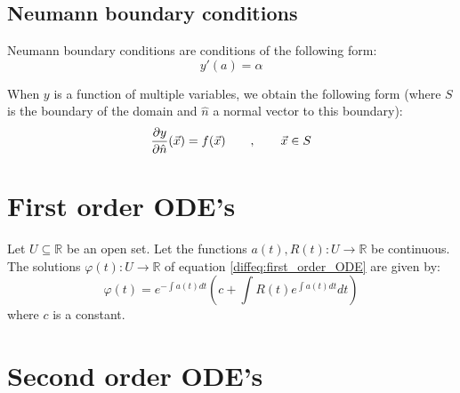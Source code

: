 	\subsection{Neumann boundary conditions}
    	Neumann boundary conditions are conditions of the following form:
    	\begin{equation}
			\label{diffeq:conditions:neumann}
            y'(a) = \alpha
		\end{equation}
        
        \begin{remark}
            When $y$ is a function of multiple variables, we obtain the following form (where $S$ is the boundary of the domain and $\hat{n}$ a normal vector to this boundary):
            \begin{equation}
                \label{diffeq:conditions:neumann_multi}
                \frac{\partial y}{\partial \hat{n}}(\vec{x}) = f(\vec{x})\qquad,\qquad\vec{x}\in S
            \end{equation}
		\end{remark}
        
\section{First order ODE's}
    \begin{theorem}
		Let $U\subseteq\mathbb{R}$ be an open set. Let the functions $a(t), R(t):U\rightarrow\mathbb{R}$ be continuous. The solutions $\varphi(t):U\rightarrow\mathbb{R}$ of equation \ref{diffeq:first_order_ODE} are given by:
        \begin{equation}
			\label{diffeq:first_order_general_solution}
            \boxed{\varphi(t) = e^{-\int a(t)dt}\left(c + \int R(t)e^{\int a(t)dt}dt\right)}
		\end{equation}
        where $c$ is a constant.
	\end{theorem}
        
\section{Second order ODE's}
    
